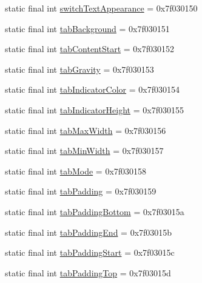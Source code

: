 \begin{DoxyCompactItemize}
static final int \mbox{\hyperlink{classandroid_1_1support_1_1design_1_1R_1_1attr_a57b7729473f85f18c278bdab4e618366}{switch\+Text\+Appearance}} = 0x7f030150
\item 
static final int \mbox{\hyperlink{classandroid_1_1support_1_1design_1_1R_1_1attr_a655d14e3167b8f64ef0f47b57e34cdc5}{tab\+Background}} = 0x7f030151
\item 
static final int \mbox{\hyperlink{classandroid_1_1support_1_1design_1_1R_1_1attr_a95a1e6a938c369ab1d4432cc581d5ee4}{tab\+Content\+Start}} = 0x7f030152
\item 
static final int \mbox{\hyperlink{classandroid_1_1support_1_1design_1_1R_1_1attr_a63623768932b683ba92fe1ee1a153e37}{tab\+Gravity}} = 0x7f030153
\item 
static final int \mbox{\hyperlink{classandroid_1_1support_1_1design_1_1R_1_1attr_a0b95949e8c3665fe8dc7a51fc7a2e72c}{tab\+Indicator\+Color}} = 0x7f030154
\item 
static final int \mbox{\hyperlink{classandroid_1_1support_1_1design_1_1R_1_1attr_a5c362741ab5aebe6a031d68b443ee3a9}{tab\+Indicator\+Height}} = 0x7f030155
\item 
static final int \mbox{\hyperlink{classandroid_1_1support_1_1design_1_1R_1_1attr_a43a4d96667624eaf72c716ba0579e3cb}{tab\+Max\+Width}} = 0x7f030156
\item 
static final int \mbox{\hyperlink{classandroid_1_1support_1_1design_1_1R_1_1attr_ad05647ddee10bb7cb00acd5d0255c461}{tab\+Min\+Width}} = 0x7f030157
\item 
static final int \mbox{\hyperlink{classandroid_1_1support_1_1design_1_1R_1_1attr_a6471efddc2adcbd6b7dd9951067fce93}{tab\+Mode}} = 0x7f030158
\item 
static final int \mbox{\hyperlink{classandroid_1_1support_1_1design_1_1R_1_1attr_a3a90a1dfd1478f5a9c0bc2a76f3ee8f9}{tab\+Padding}} = 0x7f030159
\item 
static final int \mbox{\hyperlink{classandroid_1_1support_1_1design_1_1R_1_1attr_a6d2423ea97ff731bf8b496c145453dd1}{tab\+Padding\+Bottom}} = 0x7f03015a
\item 
static final int \mbox{\hyperlink{classandroid_1_1support_1_1design_1_1R_1_1attr_a25d1166da428a3dc79929e61da4de252}{tab\+Padding\+End}} = 0x7f03015b
\item 
static final int \mbox{\hyperlink{classandroid_1_1support_1_1design_1_1R_1_1attr_a00b1b6ab43f4c3c5f1dfcf5eabc6a4ac}{tab\+Padding\+Start}} = 0x7f03015c
\item 
static final int \mbox{\hyperlink{classandroid_1_1support_1_1design_1_1R_1_1attr_ab0be958901fbf172bc67a7f4bc1f05cf}{tab\+Padding\+Top}} = 0x7f03015d

\end{DoxyCompactItemize}
